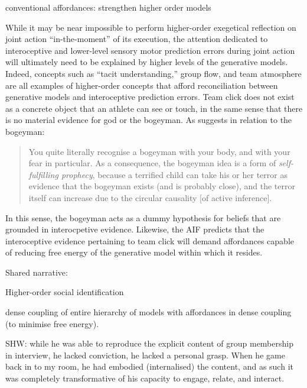 \begin{CJK}{UTF8}{gbsn}
conventional affordances: strengthen higher order models




While it may be near impossible to perform higher-order exegetical reflection on joint action ``in-the-moment'' of its execution, the attention dedicated to interoceptive and lower-level sensory motor prediction errors during joint action will ultimately need to be explained by higher levels of the generative models. Indeed, concepts such as ``tacit understanding,'' group flow, and team atmosphere are all examples of higher-order concepts that afford reconciliation between generative models and interoceptive prediction errors.  Team click does not exist as a concrete object that an athlete can see or touch, in the same sense that there is no material evidence for god or the bogeyman.  As \citep[909]{Pezzulo2014} suggests in relation to the bogeyman:

    \begin{quote}
      You quite literally recognise a bogeyman with your body, and with your fear in particular.  As a consequence, the bogeyman idea is a form of \textit{self-fulfilling prophecy}, because a terrified child can take his or her terror as evidence that the bogeyman exists (and is probably close), and the terror itself can increase due to the circular causality [of active inference].
    \end{quote}

In this sense, the bogeyman acts as a dummy hypothesis for beliefs that are grounded in interocpetive evidence.  Likewise, the AIF predicts that the interoceptive evidence pertaining to team click will demand affordances capable of reducing free energy of the generative model within which it resides.


Shared narrative:


Higher-order social identification

dense coupling of entire hierarchy of models with affordances in dense coupling (to minimise free energy).

SHW: while he was able to reproduce the explicit content of group membership in interview, he lacked conviction, he lacked a personal grasp.  When he game back in to my room, he had embodied (internalised)
the content, and as such it was completely transformative of his capacity to engage, relate, and interact.




\end{CJK}
